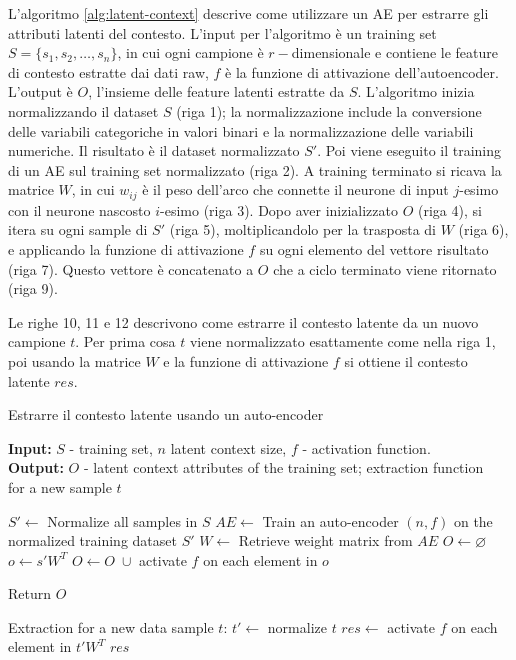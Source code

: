 L'algoritmo \autoref{alg:latent-context} descrive come utilizzare un AE per estrarre gli attributi latenti del contesto. L'input per l'algoritmo è un training set $S = \{s_1, s_2, \dots, s_n\}$, in cui ogni campione è $r-$dimensionale e contiene le feature di contesto estratte dai dati raw, $f$ è la funzione di attivazione dell'autoencoder. L'output è $O$, l'insieme delle feature latenti estratte da $S$. L'algoritmo inizia normalizzando il dataset $S$ (riga 1); la normalizzazione include la conversione delle variabili categoriche in valori binari e la normalizzazione delle variabili numeriche. Il risultato è il dataset normalizzato $S'$. Poi viene eseguito il training di un AE sul training set normalizzato (riga 2). A training terminato si ricava la matrice $W$, in cui $w_{ij}$ è il peso dell'arco che connette il neurone di input $j$-esimo con il neurone nascosto $i$-esimo (riga 3). Dopo aver inizializzato $O$ (riga 4), si itera su ogni sample di $S'$ (riga 5), moltiplicandolo per la trasposta di $W$ (riga 6), e applicando la funzione di attivazione $f$ su ogni elemento del vettore risultato (riga 7). Questo vettore è concatenato a $O$ che a ciclo terminato viene ritornato (riga 9).

Le righe 10, 11 e 12 descrivono come estrarre il contesto latente da un nuovo campione $t$. Per prima cosa $t$ viene normalizzato esattamente come nella riga 1, poi usando la matrice $W$ e la funzione di attivazione $f$ si ottiene il contesto latente $res$.

\begin{algorithm}
\caption{Estrarre il contesto latente usando un auto-encoder \cite{latent-context}}
\label{alg:latent-context}
 \hspace*{\algorithmicindent} \textbf{Input:} $S$ - training set, $n$ latent context size, $f$ - activation function.\\
 \hspace*{\algorithmicindent} \textbf{Output:} $O$ - latent context attributes of the training set; extraction function\\ 
 \hspace*{\algorithmicindent} for a new sample $t$
\begin{algorithmic}[1]
\STATE $S' \leftarrow$ Normalize all samples in $S$
\STATE $AE \leftarrow$ Train an auto-encoder $(n,f)$ on the normalized training dataset $S'$
\STATE $W \leftarrow$ Retrieve weight matrix from $AE$
\STATE $O \leftarrow \varnothing$
	\STATE $o \leftarrow s'W^T$
	\STATE $O \leftarrow O \; \cup$ activate $f$ on each element in $o$ 
\ENDFOR

\STATE Return $O$

Extraction for a new data sample $t$:
\STATE $t' \leftarrow$ normalize $t$
\STATE $res \leftarrow$ activate $f$ on each element in $t'W^T$ 
\RETURN $res$

\end{algorithmic}
\end{algorithm}


